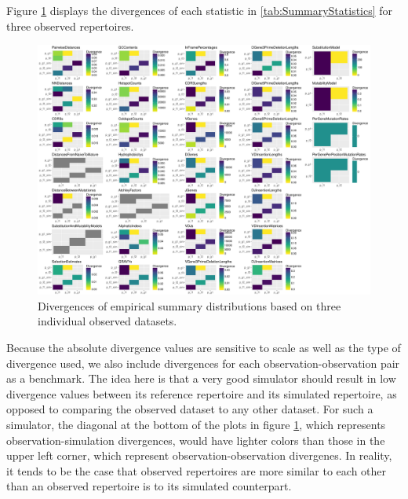 \documentclass{article}
\begin{document}
Figure \ref{SimObs} displays the divergences of each statistic in \ref{tab:SummaryStatistics} for three observed repertoires.
\begin{figure}
    \includegraphics[width=\linewidth]{Figures/sim_obs.pdf}
    \caption{Divergences of empirical summary distributions based on three individual observed datasets.}
    \label{SimObs}
\end{figure}
Because the absolute divergence values are sensitive to scale as well as the type of divergence used, we also include divergences for each observation-observation pair as a benchmark.
The idea here is that a very good simulator should result in low divergence values between its reference repertoire and its simulated repertoire, as opposed to comparing the observed dataset to any other dataset.
For such a simulator, the diagonal at the bottom of the plots in figure \ref{SimObs}, which represents observation-simulation divergences, would have lighter colors than those in the upper left corner, which represent observation-observation divergenes.
In reality, it tends to be the case that observed repertoires are more similar to each other than an observed repertoire is to its simulated counterpart.
\end{document}
